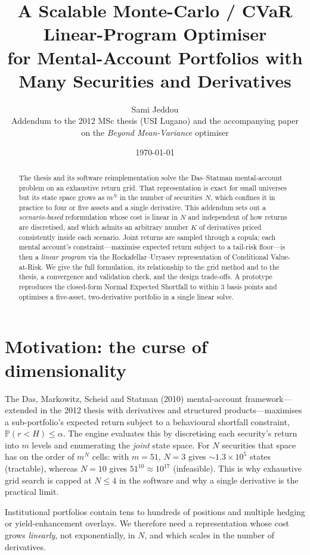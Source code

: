 \documentclass[11pt]{article}
\title{\textbf{A Scalable Monte-Carlo / CVaR Linear-Program Optimiser\\
for Mental-Account Portfolios with Many Securities and Derivatives}}
\author{Sami Jeddou\\[2pt]
\small Addendum to the 2012 MSc thesis (USI Lugano) and the accompanying paper\\
\small on the \emph{Beyond Mean-Variance} optimiser}
\date{\today}
\newcommand{\Prob}{\mathbb{P}}
\begin{document}
\maketitle

\begin{abstract}
\noindent
The thesis and its software reimplementation solve the Das--Statman mental-account
problem on an exhaustive return grid. That representation is exact for small
universes but its state space grows as $m^{N}$ in the number of securities $N$,
which confines it in practice to four or five assets and a single derivative.
This addendum sets out a \emph{scenario-based} reformulation whose cost is linear
in $N$ and independent of how returns are discretised, and which admits an
arbitrary number $K$ of derivatives priced consistently inside each scenario.
Joint returns are sampled through a copula; each mental account's
constraint---maximise expected return subject to a tail-risk floor---is then a
\emph{linear program} via the Rockafellar--Uryasev representation of Conditional
Value-at-Risk. We give the full formulation, its relationship to the grid method
and to the thesis, a convergence and validation check, and the design trade-offs.
A prototype reproduces the closed-form Normal Expected Shortfall to within $3$
basis points and optimises a five-asset, two-derivative portfolio in a single
linear solve.
\end{abstract}

\section{Motivation: the curse of dimensionality}
The Das, Markowitz, Scheid and Statman (2010) mental-account framework---extended
in the 2012 thesis with derivatives and structured products---maximises a sub-portfolio's
expected return subject to a behavioural shortfall constraint,
$\Prob(r < H) \le \alpha$. The engine evaluates this by discretising each
security's return into $m$ levels and enumerating the \emph{joint} state space.
For $N$ securities that space has on the order of $m^{N}$ cells: with $m=51$,
$N=3$ gives $\sim\!1.3\times10^{5}$ states (tractable), whereas $N=10$ gives
$51^{10}\approx10^{17}$ (infeasible). This is why exhaustive grid search is capped
at $N\le 4$ in the software and why a single derivative is the practical limit.

Institutional portfolios contain tens to hundreds of positions and multiple
hedging or yield-enhancement overlays. We therefore need a representation whose
cost grows \emph{linearly}, not exponentially, in $N$, and which scales in the
number of derivatives.
\end{document}
